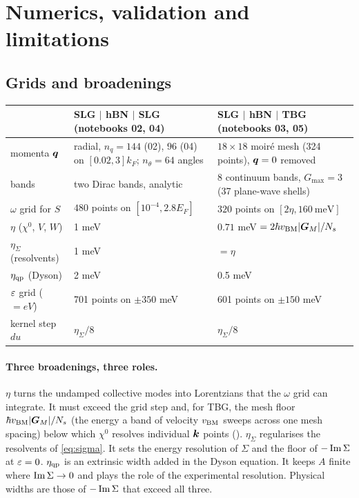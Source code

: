 \section{Numerics, validation and limitations}
\label{sec:numerics}

\subsection{Grids and broadenings}

\begin{center}
\small
\begin{tabularx}{\textwidth}{lXX}
\toprule
& SLG $|$ hBN $|$ SLG (notebooks 02, 04) & SLG $|$ hBN $|$ TBG (notebooks 03, 05)\\
\midrule
momenta $\bm q$ & radial, $n_q=144$ (02), $96$ (04) on $[0.02,3]k_F$; $n_\theta=64$ angles & $18\times18$ moir\'e mesh (324 points), $\bm q=0$ removed\\
bands & two Dirac bands, analytic & $8$ continuum bands, $G_{\max}=3$ (37 plane-wave shells)\\
$\omega$ grid for $S$ & $480$ points on $[10^{-4},2.8E_F]$ & $320$ points on $[2\eta,160\ \text{meV}]$\\
$\eta$ ($\chi^0$, $V$, $W$) & 1 meV & $0.71$ meV $=2\hbar v_{\rm BM}|\bm G_M|/N_s$\\
$\eta_\Sigma$ (resolvents) & 1 meV & $=\eta$\\
$\eta_{\rm qp}$ (Dyson) & 2 meV & 0.5 meV\\
$\varepsilon$ grid ($=eV$) & 701 points on $\pm350$ meV & 601 points on $\pm150$ meV\\
kernel step $du$ & $\eta_\Sigma/8$ & $\eta_\Sigma/8$\\
\bottomrule
\end{tabularx}
\end{center}

\paragraph{Three broadenings, three roles.} $\eta$ turns the undamped collective modes into Lorentzians that the
$\omega$ grid can integrate. It must exceed the grid step and, for TBG, the mesh floor $\hbar v_{\rm BM}|\bm G_M|/N_s$ (the energy a band
of velocity $v_{\rm BM}$ sweeps across one mesh spacing) below which
$\chi^0$ resolves individual $\bm k$ points (). $\eta_\Sigma$ regularises the resolvents of
\cref{eq:sigma}. It sets the energy resolution of $\Sigma$ and the floor of $-\operatorname{Im}\Sigma$ at $\varepsilon=0$. $\eta_{\rm qp}$ is
an extrinsic width added in the Dyson equation. It keeps $A$ finite where $\operatorname{Im}\Sigma\to0$ and plays the role of
the experimental resolution. Physical widths are those of $-\operatorname{Im}\Sigma$ that exceed all three.


